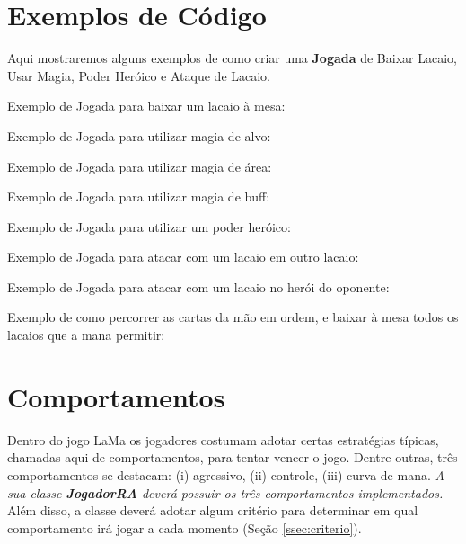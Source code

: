\documentclass[10pt]{article}
\begin{document}
\section{Exemplos de Código}

Aqui mostraremos alguns exemplos de como criar uma \textbf{Jogada} de Baixar Lacaio, Usar Magia, Poder Heróico e Ataque de Lacaio.

Exemplo de Jogada para baixar um lacaio à mesa:



Exemplo de Jogada para utilizar magia de alvo:



Exemplo de Jogada para utilizar magia de área:



Exemplo de Jogada para utilizar magia de buff:



Exemplo de Jogada para utilizar um poder heróico:



Exemplo de Jogada para atacar com um lacaio em outro lacaio:



Exemplo de Jogada para atacar com um lacaio no herói do oponente:



Exemplo de como percorrer as cartas da mão em ordem, e baixar à mesa todos os lacaios que a mana permitir:



\section{Comportamentos}

Dentro do jogo LaMa os jogadores costumam adotar certas estratégias típicas, chamadas aqui de comportamentos, para tentar vencer o jogo. Dentre outras, três comportamentos se destacam: (i) agressivo, (ii) controle, (iii) curva de mana. \textit{A sua classe \textbf{JogadorRA} deverá possuir os três comportamentos implementados.} Além disso, a classe deverá adotar algum critério para determinar em qual comportamento irá jogar a cada momento (Seção \ref{ssec:criterio}).
\end{document}
